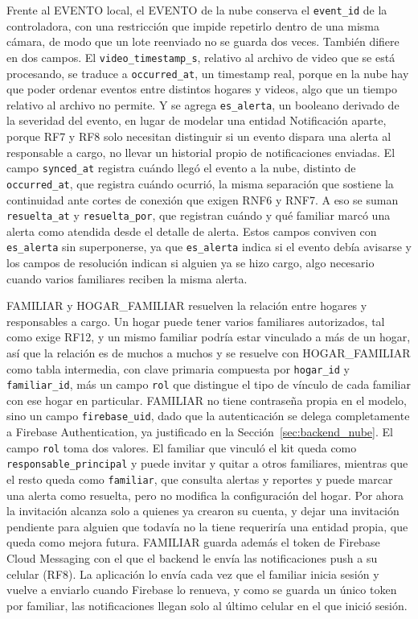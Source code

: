 Frente al EVENTO local, el EVENTO de la nube conserva el \texttt{event\_id} de la controladora, con una restricción que impide repetirlo dentro de una misma cámara, de modo que un lote reenviado no se guarda dos veces.
También difiere en dos campos.
El \texttt{video\_\allowbreak timestamp\_\allowbreak s}, relativo al archivo de video que se está procesando, se traduce a \texttt{occurred\_at}, un timestamp real, porque en la nube hay que poder ordenar eventos entre distintos hogares y videos, algo que un tiempo relativo al archivo no permite.
Y se agrega \texttt{es\_alerta}, un booleano derivado de la severidad del evento, en lugar de modelar una entidad Notificación aparte, porque RF7 y RF8 solo necesitan distinguir si un evento dispara una alerta al responsable a cargo, no llevar un historial propio de notificaciones enviadas.
El campo \texttt{synced\_at} registra cuándo llegó el evento a la nube, distinto de \texttt{occurred\_at}, que registra cuándo ocurrió, la misma separación que sostiene la continuidad ante cortes de conexión que exigen RNF6 y RNF7.
A eso se suman \texttt{resuelta\_at} y \texttt{resuelta\_por}, que registran cuándo y qué familiar marcó una alerta como atendida desde el detalle de alerta.
Estos campos conviven con \texttt{es\_alerta} sin superponerse, ya que \texttt{es\_alerta} indica si el evento debía avisarse y los campos de resolución indican si alguien ya se hizo cargo, algo necesario cuando varios familiares reciben la misma alerta.

FAMILIAR y HOGAR\_FAMILIAR resuelven la relación entre hogares y responsables a cargo.
Un hogar puede tener varios familiares autorizados, tal como exige RF12, y un mismo familiar podría estar vinculado a más de un hogar, así que la relación es de muchos a muchos y se resuelve con HOGAR\_FAMILIAR como tabla intermedia, con clave primaria compuesta por \texttt{hogar\_id} y \texttt{familiar\_id}, más un campo \texttt{rol} que distingue el tipo de vínculo de cada familiar con ese hogar en particular.
FAMILIAR no tiene contraseña propia en el modelo, sino un campo \texttt{firebase\_uid}, dado que la autenticación se delega completamente a Firebase Authentication, ya justificado en la Sección~\ref{sec:backend_nube}.
El campo \texttt{rol} toma dos valores.
El familiar que vinculó el kit queda como \texttt{responsable\_principal} y puede invitar y quitar a otros familiares, mientras que el resto queda como \texttt{familiar}, que consulta alertas y reportes y puede marcar una alerta como resuelta, pero no modifica la configuración del hogar.
Por ahora la invitación alcanza solo a quienes ya crearon su cuenta, y dejar una invitación pendiente para alguien que todavía no la tiene requeriría una entidad propia, que queda como mejora futura.
FAMILIAR guarda además el token de Firebase Cloud Messaging con el que el backend le envía las notificaciones push a su celular (RF8).
La aplicación lo envía cada vez que el familiar inicia sesión y vuelve a enviarlo cuando Firebase lo renueva, y como se guarda un único token por familiar, las notificaciones llegan solo al último celular en el que inició sesión.

